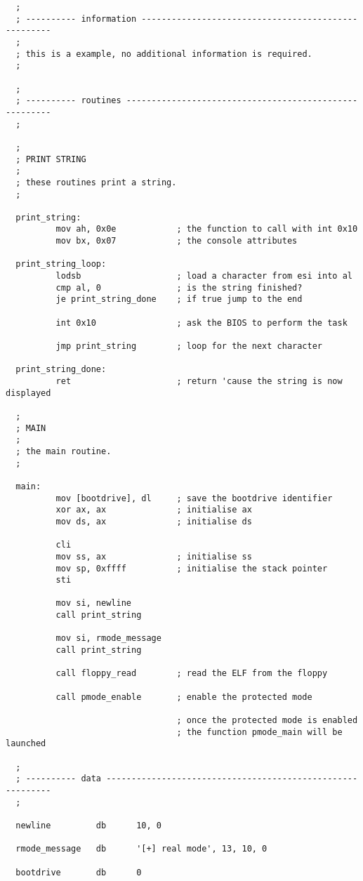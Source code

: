 \begin{verbatim}
  ;
  ; ---------- information ----------------------------------------------------
  ;
  ; this is a example, no additional information is required.
  ;

  ;
  ; ---------- routines -------------------------------------------------------
  ;

  ;
  ; PRINT STRING
  ;
  ; these routines print a string.
  ;

  print_string:
          mov ah, 0x0e            ; the function to call with int 0x10
          mov bx, 0x07            ; the console attributes

  print_string_loop:
          lodsb                   ; load a character from esi into al
          cmp al, 0               ; is the string finished?
          je print_string_done    ; if true jump to the end

          int 0x10                ; ask the BIOS to perform the task

          jmp print_string        ; loop for the next character

  print_string_done:
          ret                     ; return 'cause the string is now displayed

  ;
  ; MAIN
  ;
  ; the main routine.
  ;

  main:
          mov [bootdrive], dl     ; save the bootdrive identifier
          xor ax, ax              ; initialise ax
          mov ds, ax              ; initialise ds

          cli
          mov ss, ax              ; initialise ss
          mov sp, 0xffff          ; initialise the stack pointer
          sti

          mov si, newline
          call print_string

          mov si, rmode_message
          call print_string

          call floppy_read        ; read the ELF from the floppy

          call pmode_enable       ; enable the protected mode

                                  ; once the protected mode is enabled
                                  ; the function pmode_main will be launched

  ;
  ; ---------- data -----------------------------------------------------------
  ;

  newline         db      10, 0

  rmode_message   db      '[+] real mode', 13, 10, 0

  bootdrive       db      0
\end{verbatim}
